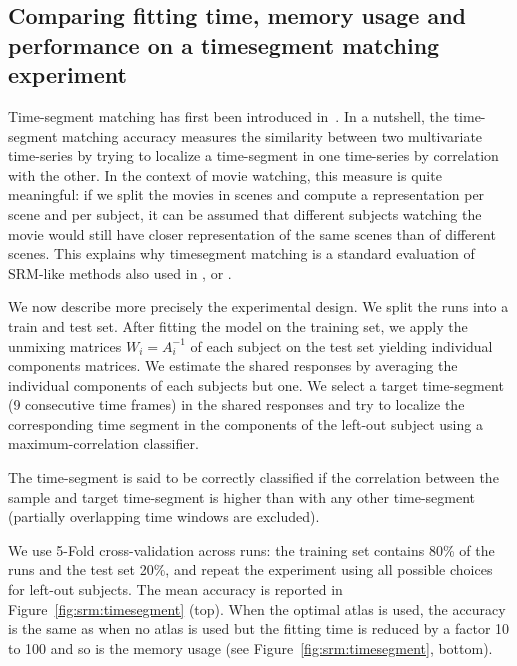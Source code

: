 \documentclass{article}
\begin{document}
\subsection{Comparing fitting time, memory usage and performance on a
  timesegment matching experiment}
\label{sec:timesegment_expe}
\label{timesegment_expe}
Time-segment matching has first been introduced
in~\cite{chen2015reduced}.
%
In a nutshell, the time-segment matching accuracy measures the similarity
between two multivariate time-series by trying to localize a time-segment in one
time-series by correlation with the other.
%
In the context of movie watching, this measure is quite meaningful: if
we split the movies in scenes and compute a representation per scene
and per subject, it can be assumed that different subjects watching
the movie would still have closer representation of the same scenes
than of different scenes.
%
This explains why timesegment matching is a standard evaluation of SRM-like methods also used in  \cite{guntupalli2018computational}, \cite{Nastase741975} or
\cite{zhang2016searchlight}.
%


We now describe more precisely the experimental design.
%
We split the runs into a train and test set.
%
After fitting the model on the
training set, we apply the unmixing matrices $W_i=A_i^{-1}$ of each subject on
the test set yielding individual components matrices.
%
We estimate the shared responses by averaging the individual components of each
subjects but one.
%
We select a target time-segment (9 consecutive time frames) in the shared
responses and try to localize the corresponding time segment in the components
of the left-out subject using a maximum-correlation classifier.
%

The time-segment is said to be
correctly classified if the correlation between the sample and target
time-segment is higher than with any other time-segment (partially overlapping
time windows are excluded).
%

% 
We use 5-Fold cross-validation across runs: the training set contains 80\% of
the runs and the test set 20\%, and repeat the experiment using all possible
choices for left-out subjects.
%
% 
The mean accuracy is reported in Figure~\ref{fig:srm:timesegment} (top).
%
When the optimal atlas is used, the accuracy is the same as when no
atlas is used but the fitting time is reduced by a factor 10 to 100
and so is the memory usage (see Figure~\ref{fig:srm:timesegment},
bottom).
%

% 
\end{document}
